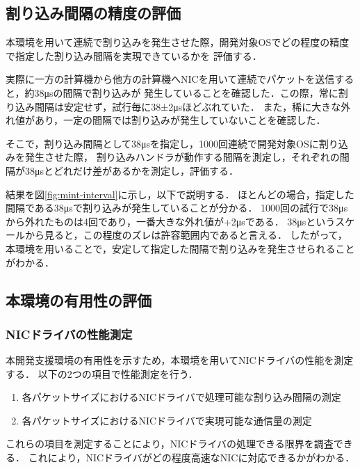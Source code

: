 \documentclass[submit,techreq,noauthor,dvipdfmx]{ipsj}
\begin{document}
\subsection{割り込み間隔の精度の評価}\label{sec:interval}


本環境を用いて連続で割り込みを発生させた際，開発対象OSでどの程度の精度で指定した割り込み間隔を実現できているかを
評価する．

実際に一方の計算機から他方の計算機へNICを用いて連続でパケットを送信すると，約\mbox{38μs}の間隔で割り込みが
発生していることを確認した．この際，常に割り込み間隔は安定せず，試行毎に\mbox{38±2μs}ほどぶれていた．
また，稀に大きな外れ値があり，一定の間隔では割り込みが発生していないことを確認した．

そこで，割り込み間隔として\mbox{38μs}を指定し，1000回連続で開発対象OSに割り込みを発生させた際，
割り込みハンドラが動作する間隔を測定し，それぞれの間隔が\mbox{38μs}とどれだけ差があるかを測定し，評価する．

結果を図\ref{fig:mint-interval}に示し，以下で説明する．
ほとんどの場合，指定した間隔である\mbox{38μs}で割り込みが発生していることが分かる．
1000回の試行で\mbox{38μs}から外れたものは4回であり，一番大きな外れ値が\mbox{+2μs}である．
\mbox{38μs}というスケールから見ると，この程度のズレは許容範囲内であると言える．
したがって，本環境を用いることで，安定して指定した間隔で割り込みを発生させられることがわかる．

\subsection{本環境の有用性の評価}\label{sec:interval}

\subsubsection{NICドライバの性能測定}\label{sec:interval}

本開発支援環境の有用性を示すため，本環境を用いてNICドライバの性能を測定する．
以下の2つの項目で性能測定を行う．
\begin{enumerate}
    \item 各パケットサイズにおけるNICドライバで処理可能な割り込み間隔の測定
    \item 各パケットサイズにおけるNICドライバで実現可能な通信量の測定
\end{enumerate}
これらの項目を測定することにより，NICドライバの処理できる限界を調査できる．
これにより，NICドライバがどの程度高速なNICに対応できるかがわかる．
\end{document}
